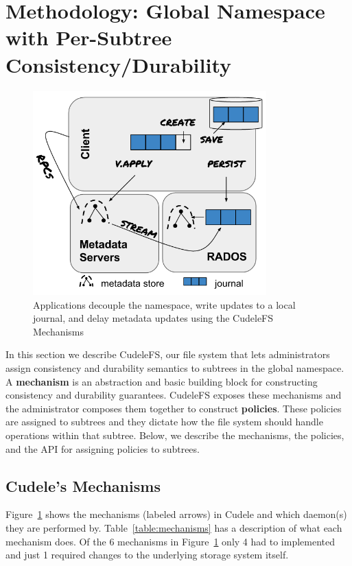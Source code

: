 \section{Methodology: Global Namespace with Per-Subtree Consistency/Durability}
\label{sec:methodology-decoupled-namespaces}

\begin{figure}[tb]
\centering
\includegraphics[width=90mm]{figures/fig-decouple.png}
\caption{Applications decouple the namespace, write updates to a local journal,
and delay metadata updates using the CudeleFS Mechanisms }\label{fig:decouple}
\end{figure}

In this section we describe CudeleFS, our file system that lets administrators
assign consistency and durability semantics to subtrees in the global
namespace. A \textbf{mechanism} is an abstraction and basic building block for
constructing consistency and durability guarantees. CudeleFS exposes these
mechanisms and the administrator composes them together to construct
\textbf{policies}. These policies are assigned to subtrees and they dictate how
the file system should handle operations within that subtree.  Below, we
describe the mechanisms, the policies, and the API for assigning policies to
subtrees.

\subsection{Cudele's Mechanisms}
\label{sec:cudeles-mechanisms}

Figure~\ref{fig:decouple} shows the mechanisms (labeled arrows) in Cudele and
which daemon(s) they are performed by.  Table~\ref{table:mechanisms} has a
description of what each mechanism does.  Of the 6 mechanisms in
Figure~\ref{fig:decouple} only 4 had to implemented and just 1 required changes to
the underlying storage system itself.


